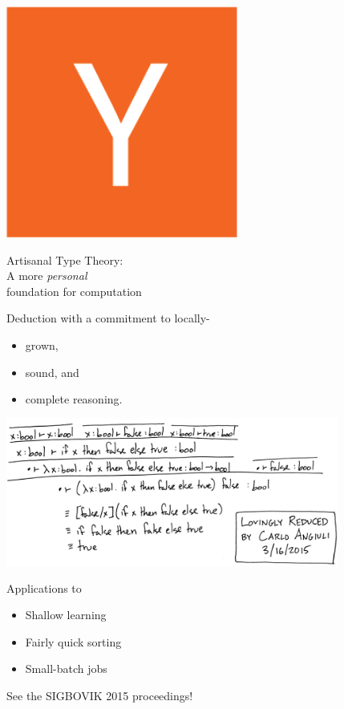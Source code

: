 \documentclass{beamer}
\begin{document}
\begin{frame}
\centering
\includegraphics[width=3in]{ycomb.png}
\end{frame}

\begin{frame}
\centering
{\LARGE Artisanal Type Theory: \\ A more \emph{personal} \\
foundation for computation}
\end{frame}

\begin{frame}
\Large
Deduction with a commitment to locally-
\begin{itemize}
\Large
\item grown,
\item sound, and
\item complete reasoning.
\end{itemize}
\end{frame}

\begin{frame}
\centering
\includegraphics[width=4.3in]{../isfalse.png}
\end{frame}

\begin{frame}
\Large
Applications to
\begin{itemize}
\Large
\item Shallow learning
\item Fairly quick sorting
\item Small-batch jobs
\end{itemize}
\end{frame}

\begin{frame}
\centering
\LARGE
See the SIGBOVIK 2015 proceedings!
\end{frame}
\end{document}
